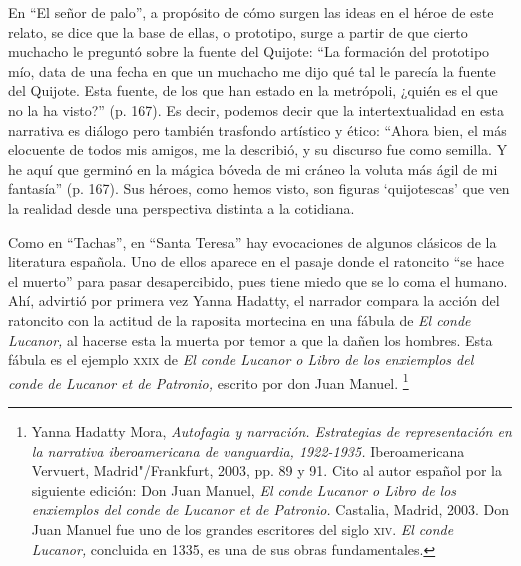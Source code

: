 \documentclass[14pt,twoside,final]{extbook} %
\let\oldfootnote\footnote
\renewcommand\footnote[1]{%
\oldfootnote{\hspace{1mm}#1}}
\begin{document}
En ``El señor de palo'', a propósito de cómo surgen las ideas en el héroe de este relato, se dice que la base de ellas, o prototipo, surge a partir de que cierto muchacho le preguntó sobre la fuente del Quijote: ``La formación del prototipo mío, data de una fecha en que un muchacho me dijo qué tal le parecía la fuente del Quijote. Esta fuente, de los que han estado en la metrópoli, ¿quién es el que no la ha visto?'' (p. 167). Es decir, podemos decir que la intertextualidad en esta narrativa es diálogo pero también trasfondo artístico y ético: ``Ahora bien, el más elocuente de todos mis amigos, me la describió, y su discurso fue como semilla. Y he aquí que germinó en la mágica bóveda de mi cráneo la voluta más ágil de mi fantasía'' (p. 167). Sus héroes, como hemos visto, son figuras `quijotescas' que ven la realidad desde una perspectiva distinta a la cotidiana.

Como en ``Tachas'', en ``Santa Teresa'' hay evocaciones de algunos clásicos de la literatura española. Uno de ellos aparece en el pasaje donde el ratoncito ``se hace el muerto'' para pasar
desapercibido, pues tiene miedo que se lo coma el humano. Ahí, advirtió por primera vez Yanna Hadatty, el narrador compara la acción del ratoncito con la actitud de la raposita mortecina en una fábula de \emph{El conde Lucanor,} al hacerse esta la muerta por temor a que la dañen los hombres. Esta fábula es el ejemplo \textsc{xxix} de \emph{El conde Lucanor o Libro de los enxiemplos del conde de Lucanor et de Patronio,} escrito por don Juan Manuel.\footnote{Yanna Hadatty Mora, \emph{Autofagia y narración. Estrategias de representación en la narrativa iberoamericana de vanguardia, 1922-1935.} Iberoamericana Vervuert, Madrid"/Frankfurt, 2003, pp. 89 y 91. Cito al autor español por la siguiente edición: Don Juan Manuel, \emph{El conde Lucanor o Libro de los enxiemplos del conde de Lucanor et de Patronio.} Castalia, Madrid, 2003. Don Juan Manuel fue uno de los grandes escritores del siglo \textsc{xiv}. \emph{El conde Lucanor,} concluida en 1335, es una de sus obras fundamentales.}
\end{document}
